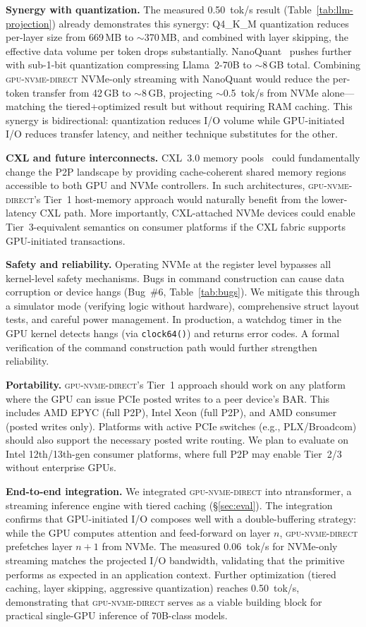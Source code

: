 \documentclass{article}
\newcommand{\sysname}{\textsc{gpu-nvme-direct}}
\begin{document}
\textbf{Synergy with quantization.} The measured 0.50~tok/s result
(Table~\ref{tab:llm-projection}) already demonstrates this synergy:
Q4\_K\_M quantization reduces per-layer size from 669\,MB to $\sim$370\,MB,
and combined with layer skipping, the effective data volume per token drops
substantially. NanoQuant~\cite{chong2026nanoquant} pushes further with
sub-1-bit quantization compressing Llama~2-70B to $\sim$8\,GB total.
Combining \sysname{} NVMe-only streaming with NanoQuant would reduce the
per-token transfer from 42\,GB to $\sim$8\,GB, projecting $\sim$0.5~tok/s
from NVMe alone---matching the tiered+optimized result but without requiring
RAM caching. This synergy is bidirectional: quantization reduces I/O volume
while GPU-initiated I/O reduces transfer latency, and neither technique
substitutes for the other.

\textbf{CXL and future interconnects.} CXL~3.0 memory pools~\cite{zhong2025cxl}
could fundamentally change the P2P landscape by providing cache-coherent
shared memory regions accessible to both GPU and NVMe controllers. In such
architectures, \sysname{}'s Tier~1 host-memory approach would naturally
benefit from the lower-latency CXL path. More importantly, CXL-attached
NVMe devices could enable Tier~3-equivalent semantics on consumer platforms
if the CXL fabric supports GPU-initiated transactions.

\textbf{Safety and reliability.} Operating NVMe at the register level bypasses
all kernel-level safety mechanisms. Bugs in command construction can cause
data corruption or device hangs (Bug~\#6, Table~\ref{tab:bugs}). We mitigate
this through a simulator mode (verifying logic without hardware),
comprehensive struct layout tests, and careful power management. In
production, a watchdog timer in the GPU kernel detects hangs (via
\texttt{clock64()}) and returns error codes. A formal verification of the
command construction path would further strengthen reliability.

\textbf{Portability.} \sysname{}'s Tier~1 approach should work on any platform
where the GPU can issue PCIe posted writes to a peer device's BAR. This
includes AMD EPYC (full P2P), Intel Xeon (full P2P), and AMD consumer (posted
writes only). Platforms with active PCIe switches (e.g., PLX/Broadcom) should
also support the necessary posted write routing. We plan to evaluate on Intel
12th/13th-gen consumer platforms, where full P2P may enable Tier~2/3 without
enterprise GPUs.

\textbf{End-to-end integration.} We integrated \sysname{} into ntransformer,
a streaming inference engine with tiered caching (\S\ref{sec:eval}). The
integration confirms that GPU-initiated I/O composes well with a
double-buffering strategy: while the GPU computes attention and feed-forward
on layer $n$, \sysname{} prefetches layer $n+1$ from NVMe. The measured
0.06~tok/s for NVMe-only streaming matches the projected I/O bandwidth,
validating that the primitive performs as expected in an application context.
Further optimization (tiered caching, layer skipping, aggressive quantization)
reaches 0.50~tok/s, demonstrating that \sysname{} serves as a viable building
block for practical single-GPU inference of 70B-class models.
\end{document}
